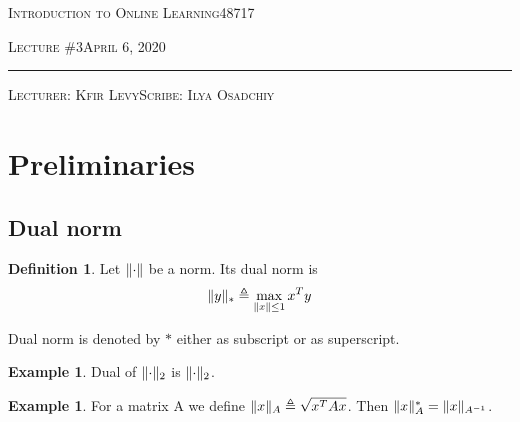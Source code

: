 \documentclass[11pt]{article}
\theoremstyle{definition}
\newtheorem{definition}[theorem]{Definition}
\theoremstyle{definition}
\newtheorem{example}[theorem]{Example}
\def \lecturenum  {3}
\def \lecturedate {April 6, 2020}
\def \scribe      {Ilya Osadchiy}
\begin{document}
\noindent
\begin{minipage}[t]{1\columnwidth}%
\textsc{Introduction to Online Learning}\hspace*{\fill}48717
\vspace{2mm}

\textsc{\LARGE Lecture \#\lecturenum}\hspace*{\fill}\textsc{\lecturedate}

\noindent \rule[0.5ex]{1\linewidth}{1pt}

\textsc{Lecturer: Kfir Levy\hspace*{\fill}Scribe: \scribe}
\vspace{10mm}
\end{minipage}














\section{Preliminaries}

\subsection{Dual norm}
\begin{definition}
Let $\mathopen\| \cdot \mathclose\|$ be a norm. Its dual norm is
\begin{equation*}
	\mathopen\| y \mathclose\|_* \triangleq \max_{\mathopen\| x \mathclose\| \leq 1} {x^T y}
\end{equation*}
\end{definition}

Dual norm is denoted by $*$ either as subscript or as superscript.

\begin{example}
Dual of $\mathopen\| \cdot \mathclose\|_2$ is $\mathopen\| \cdot \mathclose\|_2$.
\end{example}

\begin{example}
For a matrix A we define $ \mathopen\| x \mathclose\|_A \triangleq \sqrt{x^T A x} $. Then $ \mathopen\| x \mathclose\|_A^* = \mathopen\| x \mathclose\|_{A^{-1}} $.
\end{example}
\end{document}
